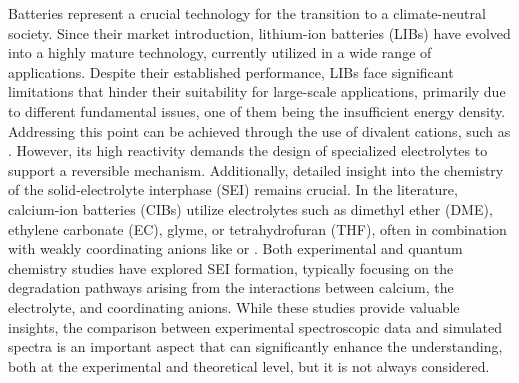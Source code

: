 \documentclass[%
aip,
amsmath,amssymb,
preprint,%
jcp,
showkeys,
]{revtex4-2}
\begin{document}
Batteries represent a crucial technology for the transition to a climate-neutral society. Since their market introduction, lithium-ion batteries (LIBs) have evolved into a highly mature technology, currently utilized in a wide range of applications.\cite{zubiLithiumionBatteryState2018,kimLithiumionBatteriesOutlook2019} Despite their established performance, LIBs face significant limitations that hinder their suitability for large-scale applications, primarily due to different fundamental issues, one of them being the insufficient energy density.\cite{luReviewKeyIssues2013,li30YearsLithiumIon2018} Addressing this point can be achieved through the use of divalent cations, such as .\cite{arroyo-dedompabloAchievementsChallengesProspects2020,taghavi-kahaghPoweringFutureComprehensive2024} However, its high reactivity demands the design of specialized electrolytes to support a reversible mechanism. Additionally, detailed insight into the chemistry of the solid-electrolyte interphase (SEI) remains crucial.\cite{melemedImpactDifferentialCa22023,zhaoRevealingSolidElectrolyte2022}
In the literature, calcium-ion batteries (CIBs) utilize electrolytes such as dimethyl ether (DME), ethylene carbonate (EC), glyme, or tetrahydrofuran (THF), often in combination with weakly coordinating anions like  or  \cite{songElectrolyteOptimizationInterphase2022,zhaoRevealingSolidElectrolyte2022,bodinBoronBasedFunctionalAdditives2023}. 
Both experimental \cite{songElectrolyteOptimizationInterphase2022,melemedImpactDifferentialCa22023,bodinBoronBasedFunctionalAdditives2023} and quantum chemistry studies \cite{hahnCriticalRoleConfigurational2020,liepinyaComputationalComparisonEther2021,yamijalaStabilityCalciumIon2021} have explored SEI formation, typically focusing on the degradation pathways arising from the interactions between calcium, the electrolyte, and coordinating anions\cite{wuUnderstandingSolidElectrolyte2021,bodinBoronBasedFunctionalAdditives2023}. While these studies provide valuable insights, the comparison between experimental spectroscopic data and simulated spectra is an important aspect that can significantly enhance the understanding, both at the experimental and theoretical level, but it is not always considered.
\end{document}
